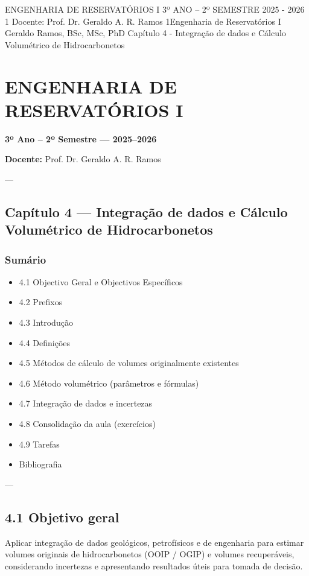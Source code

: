 \documentclass[11pt,a4paper]{article}
\begin{document}
ENGENHARIA DE RESERVATÓRIOS I
3º ANO – 2º SEMESTRE
2025 - 2026
1
Docente: Prof. Dr. Geraldo A. R. Ramos
1Engenharia de Reservatórios I
Geraldo Ramos, BSc, MSc, PhD
Capítulo 4 - Integração de dados e Cálculo Volumétrico de Hidrocarbonetos
\section{ENGENHARIA DE RESERVATÓRIOS I}
 \textbf{3º Ano – 2º Semestre — 2025–2026}

 \textbf{Docente:} Prof. Dr. Geraldo A. R. Ramos

 ---

\subsection{Capítulo 4 — Integração de dados e Cálculo Volumétrico de Hidrocarbonetos}

\subsubsection{Sumário}
\begin{itemize}
\item 4.1 Objectivo Geral e Objectivos Específicos
\item 4.2 Prefixos
\item 4.3 Introdução
\item 4.4 Definições
\item 4.5 Métodos de cálculo de volumes originalmente existentes
\item 4.6 Método volumétrico (parâmetros e fórmulas)
\item 4.7 Integração de dados e incertezas
\item 4.8 Consolidação da aula (exercícios)
\item 4.9 Tarefas
\item Bibliografia
\end{itemize}

 ---

\subsection{4.1 Objetivo geral}
Aplicar integração de dados geológicos, petrofísicos e de engenharia para estimar volumes originais de hidrocarbonetos (OOIP / OGIP) e volumes recuperáveis, considerando incertezas e apresentando resultados úteis para tomada de decisão.
\end{document}
